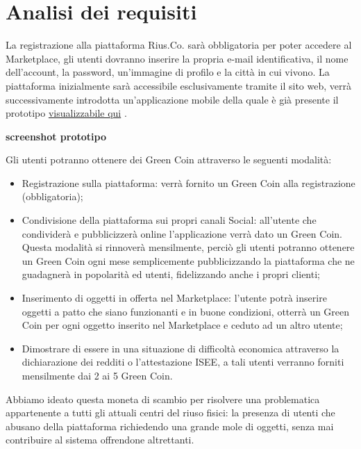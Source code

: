 \section{Analisi dei requisiti}
La registrazione alla piattaforma Rius.Co. sarà obbligatoria per poter accedere al Marketplace, gli utenti dovranno inserire la propria e-mail identificativa, il nome dell'account, la password, un'immagine di profilo e la città in cui vivono. La piattaforma inizialmente sarà accessibile esclusivamente tramite il sito web, verrà successivamente introdotta un'applicazione mobile della quale è già presente il prototipo \href{https://mauro886267.invisionapp.com/console/share/7Z10U19EHJ/476334736}{visualizzabile qui} \cite{Prototipo}.  
\medskip

\textbf{screenshot prototipo}

Gli utenti potranno ottenere dei Green Coin attraverso le seguenti modalità:
\begin{itemize}
    \item 
    Registrazione sulla piattaforma: verrà fornito un Green Coin alla registrazione (obbligatoria);
    \item Condivisione della piattaforma sui propri canali Social: all’utente che condividerà e pubblicizzerà online l’applicazione verrà dato un Green Coin. Questa modalità si rinnoverà mensilmente, perciò gli utenti potranno ottenere un Green Coin ogni mese semplicemente pubblicizzando la piattaforma che ne guadagnerà in popolarità ed utenti, fidelizzando anche i propri clienti; 
    \item Inserimento di oggetti in offerta nel Marketplace: l’utente potrà inserire oggetti a patto che siano funzionanti e in buone condizioni, otterrà un Green Coin per ogni oggetto inserito nel Marketplace e ceduto ad un altro utente;
    \item Dimostrare di essere in una situazione di difficoltà economica attraverso la dichiarazione dei redditi o l’attestazione ISEE, a tali utenti verranno forniti mensilmente dai 2 ai 5 Green Coin.
\end{itemize}
Abbiamo ideato questa moneta di scambio per risolvere una problematica appartenente a tutti gli attuali centri del riuso fisici: la presenza di utenti che abusano della piattaforma richiedendo una grande mole di oggetti, senza mai contribuire al sistema offrendone altrettanti. 
\medskip

